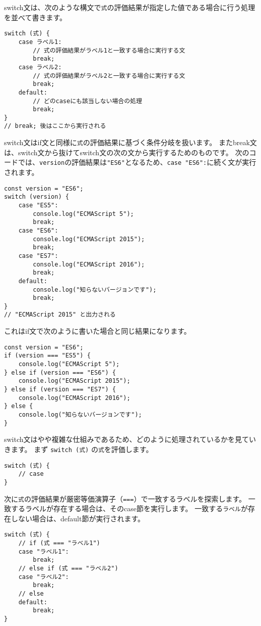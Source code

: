 switch文は、次のような構文で\texttt{式}の評価結果が指定した値である場合に行う処理を並べて書きます。

\begin{lstlisting}
switch (式) {
    case ラベル1:
        // 式の評価結果がラベル1と一致する場合に実行する文
        break;
    case ラベル2:
        // 式の評価結果がラベル2と一致する場合に実行する文
        break;
    default:
        // どのcaseにも該当しない場合の処理
        break;
}
// break; 後はここから実行される
\end{lstlisting}

switch文はif文と同様に\texttt{式}の評価結果に基づく条件分岐を扱います。
またbreak文は、switch文から抜けてswitch文の次の文から実行するためのものです。
次のコードでは、\texttt{version}の評価結果は\texttt{"ES6"}となるため、\texttt{case "ES6":}に続く文が実行されます。

\enlargethispage{\baselineskip}\begin{lstlisting}
const version = "ES6";
switch (version) {
    case "ES5":
        console.log("ECMAScript 5");
        break;
    case "ES6":
        console.log("ECMAScript 2015");
        break;
    case "ES7":
        console.log("ECMAScript 2016");
        break;
    default:
        console.log("知らないバージョンです");
        break;
}
// "ECMAScript 2015" と出力される
\end{lstlisting}

これはif文で次のように書いた場合と同じ結果になります。
\vspace{-1mm}
\begin{lstlisting}
const version = "ES6";
if (version === "ES5") {
    console.log("ECMAScript 5");
} else if (version === "ES6") {
    console.log("ECMAScript 2015");
} else if (version === "ES7") {
    console.log("ECMAScript 2016");
} else {
    console.log("知らないバージョンです");
}
\end{lstlisting}
\vspace{-1mm}
switch文はやや複雑な仕組みであるため、どのように処理されているかを見ていきます。
まず \texttt{switch (式)}
の\texttt{式}を評価します。
\vspace{-1mm}
\begin{lstlisting}
switch (式) {
    // case
}
\end{lstlisting}
\vspace{-1mm}
次に\texttt{式}の評価結果が厳密等価演算子（\texttt{===}）で一致するラベルを探索します。
一致するラベルが存在する場合は、そのcase節を実行します。
一致する\texttt{ラベル}が存在しない場合は、default節が実行されます。
\vspace{-1mm}
\enlargethispage{\baselineskip}\begin{lstlisting}
switch (式) {
    // if (式 === "ラベル1")
    case "ラベル1":
        break;
    // else if (式 === "ラベル2")
    case "ラベル2":
        break;
    // else
    default:
        break;
}
\end{lstlisting}

